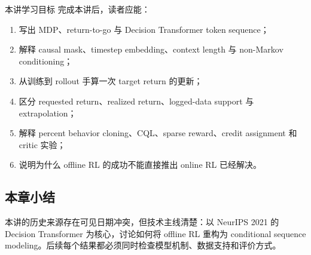 \begin{importantbox}{本讲学习目标}
完成本讲后，读者应能：
\begin{enumerate}
  \item 写出 MDP、return-to-go 与 Decision Transformer token sequence；
  \item 解释 causal mask、timestep embedding、context length 与 non-Markov conditioning；
  \item 从训练到 rollout 手算一次 target return 的更新；
  \item 区分 requested return、realized return、logged-data support 与 extrapolation；
  \item 解释 percent behavior cloning、CQL、sparse reward、credit assignment 和 critic 实验；
  \item 说明为什么 offline RL 的成功不能直接推出 online RL 已经解决。
\end{enumerate}
\end{importantbox}

\subsection{本章小结}

本讲的历史来源存在可见日期冲突，但技术主线清楚：以 NeurIPS 2021 的 Decision Transformer 为核心，讨论如何将 offline RL 重构为 conditional sequence modeling。后续每个结果都必须同时检查模型机制、数据支持和评价方式。

